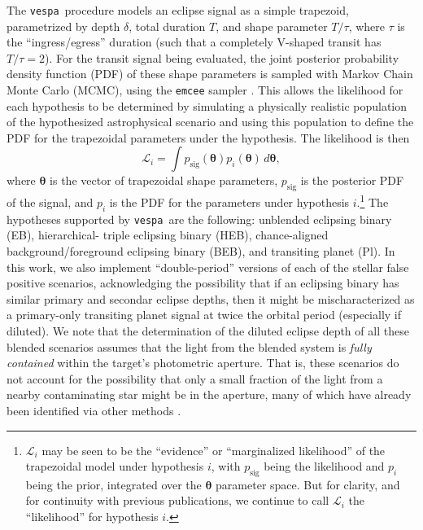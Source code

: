 \documentclass{emulateapj}
\newcommand{\eqlabel}[1]{\label{eq:#1}}
\newcommand{\vespa}{\texttt{vespa}}
\newcommand{\bvec}[1]{{\ensuremath{\boldsymbol{#1}}}}
\begin{document}
The \vespa\ procedure models an eclipse signal as a simple trapezoid,
parametrized by depth $\delta$, total duration $T$, and shape
parameter $T / \tau$, where $\tau$ is the ``ingress/egress'' duration
(such that a completely V-shaped transit has $T/\tau = 2$).  For the
transit signal being evaluated, the joint posterior probability
density function (PDF) of these shape parameters is sampled with
Markov Chain Monte Carlo (MCMC), using the \texttt{emcee} sampler
\citep{emcee}.  This allows the likelihood for each hypothesis to be
determined by simulating a physically realistic population of the
hypothesized astrophysical scenario and using this population to
define the PDF for the trapezoidal parameters under the hypothesis.
The likelihood is then \begin{equation}   \eqlabel{lhood}   \mathcal
L_i = \displaystyle \int p_\mathrm{sig}\left(\bvec{\theta}\right)
p_i\left(\bvec{\theta}\right)\,d\bvec{\theta}, \end{equation} where
$\bvec{\theta}$ is the vector of trapezoidal shape parameters,
$p_\mathrm{sig}$ is the posterior PDF of the signal, and $p_i$ is the
PDF for the parameters under hypothesis $i$.\footnote{$\mathcal L_i$
may be seen to be the ``evidence'' or ``marginalized likelihood'' of
the trapezoidal model under hypothesis $i$, with $p_\mathrm{sig}$
being the likelihood and $p_i$ being the prior, integrated over the
$\bvec{\theta}$ parameter space.  But for clarity, and for continuity
with previous publications, we continue to call $\mathcal L_i$ the
``likelihood'' for hypothesis $i$.}  The hypotheses supported by
\vespa\ are the following: unblended eclipsing binary (EB),
hierarchical- triple eclipsing binary (HEB), chance-aligned
background/foreground eclipsing binary (BEB), and transiting planet
(Pl).  In this work, we also implement ``double-period'' versions of
each of the stellar false positive scenarios, acknowledging the
possibility that if an eclipsing binary has similar primary and
secondar eclipse depths, then it might be mischaracterized as a
primary-only transiting planet signal at twice the orbital period
(especially if diluted).  We note that the determination of the
diluted eclipse depth of all these blended scenarios assumes that the
light from the blended system is \emph{fully contained} within the
target's photometric aperture.  That is, these scenarios do not
account for the possibility that only a small fraction of the light
from a nearby contaminating star might be in the aperture, many of
which have already been identified via other methods
\cite{Bryson:2013,Coughlin:2014}.
\end{document}
